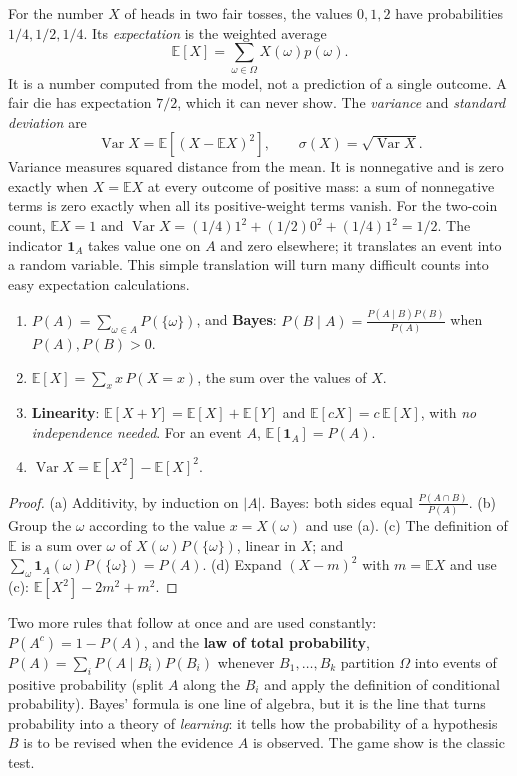 For the number $X$ of heads in two fair tosses, the values $0,1,2$ have
probabilities $1/4,1/2,1/4$. Its \emph{expectation} is the weighted average
\[
 \mathbb E[X]=\sum_{\omega\in\Omega}X(\omega)p(\omega).
\]
It is a number computed from the model, not a prediction of a single outcome.
A fair die has expectation $7/2$, which it can never show. The \emph{variance}
and \emph{standard deviation} are
\[
 \operatorname{Var}X=\mathbb E[(X-\mathbb EX)^2],\qquad
 \sigma(X)=\sqrt{\operatorname{Var}X}.
\]
Variance measures squared distance from the mean. It is nonnegative and is zero
exactly when $X=\mathbb EX$ at every outcome of positive mass: a sum of
nonnegative terms is zero exactly when all its positive-weight terms vanish.
For the two-coin count, $\mathbb EX=1$ and
$\operatorname{Var}X=(1/4)1^2+(1/2)0^2+(1/4)1^2=1/2$.
The indicator $\mathbf1_A$ takes value one on $A$ and zero elsewhere; it
translates an event into a random variable. This simple translation will turn
many difficult counts into easy expectation calculations.

\begin{proposition}\label{prop:proba}
\begin{enumerate}[label=(\alph*)]
\item $P(A)=\sum_{\omega\in A}P(\{\omega\})$, and \textbf{Bayes}: $P(B\mid A)=\frac{P(A\mid B)P(B)}{P(A)}$ when $P(A),P(B)>0$.
\item $\mathbb E[X]=\sum_xx\,P(X=x)$, the sum over the values of $X$.
\item \textbf{Linearity}: $\mathbb E[X+Y]=\mathbb E[X]+\mathbb E[Y]$ and $\mathbb E[cX]=c\,\mathbb E[X]$, with \emph{no independence needed}. For an event $A$, $\mathbb E[\mathbf 1_A]=P(A)$.
\item $\operatorname{Var}X=\mathbb E[X^2]-\mathbb E[X]^2$.
\end{enumerate}
\end{proposition}
\begin{proof}
(a) Additivity, by induction on $|A|$. Bayes: both sides equal $\frac{P(A\cap B)}{P(A)}$.
(b) Group the $\omega$ according to the value $x=X(\omega)$ and use (a).
(c) The definition of $\mathbb E$ is a sum over $\omega$ of $X(\omega)P(\{\omega\})$, linear in $X$; and $\sum_\omega\mathbf 1_A(\omega)P(\{\omega\})=P(A)$.
(d) Expand $(X-m)^2$ with $m=\mathbb E X$ and use (c): $\mathbb E[X^2]-2m^2+m^2$.
\end{proof}

Two more rules that follow at once and are used constantly: $P(A^c)=1-P(A)$, and the \textbf{law of total probability}, $P(A)=\sum_iP(A\mid B_i)P(B_i)$ whenever $B_1,\dots,B_k$ partition $\Omega$ into events of positive probability (split $A$ along the $B_i$ and apply the definition of conditional probability). Bayes' formula is one line of algebra, but it is the line that turns probability into a theory of \emph{learning}: it tells how the probability of a hypothesis $B$ is to be revised when the evidence $A$ is observed. The game show is the classic test.

